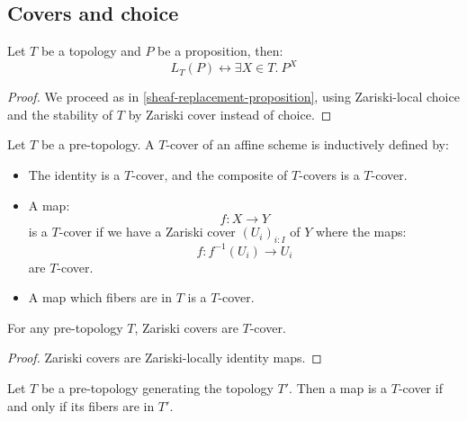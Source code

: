 \subsection{Covers and choice}

\begin{lemma}\label{sheaf-proposition}
Let $T$ be a topology and $P$ be a proposition, then:
\[L_T(P)\leftrightarrow \exists X\in T.\ P^X\]
\end{lemma}

\begin{proof}
We proceed as in \cref{sheaf-replacement-proposition}, using Zariski-local choice and the stability of $T$ by Zariski cover instead of choice.
\end{proof}

\begin{definition}
Let $T$ be a pre-topology. A $T$-cover of an affine scheme is inductively defined by:
\begin{itemize}
\item The identity is a $T$-cover, and the composite of $T$-covers is a $T$-cover.
\item A map:
\[f:X\to Y\] 
is a $T$-cover if we have a Zariski cover $(U_i)_{i:I}$ of $Y$ where the maps:
\[f:f^{-1}(U_i) \to U_i\]
are $T$-cover.
\item A map which fibers are in $T$ is a $T$-cover.
\end{itemize}
\end{definition}

\begin{lemma}\label{zariski-cover-are-cover}
For any pre-topology $T$, Zariski covers are $T$-cover.
\end{lemma}

\begin{proof}
Zariski covers are Zariski-locally identity maps.
\end{proof}

\begin{lemma}\label{cover-can-be-defined-pointwise}
Let $T$ be a pre-topology generating the topology $T'$. Then a map is a $T$-cover if and only if its fibers are in $T'$.
\end{lemma}

